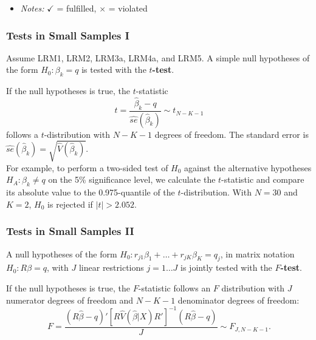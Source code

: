 \documentclass[a4paper,12pt]{article}
\begin{document}
\begin{table}[H]
{\begin{itemize}

\item \textit{Notes:} $\checkmark$ = fulfilled, $\times$ = violated%

\end{itemize}
}

\end{table}



\subsubsection*{Tests in Small Samples I}


Assume LRM1,  LRM2,  LRM3a,  LRM4a,  and LRM5.
A simple null hypotheses of the form $H_0: \beta_k = q$ is tested with the
\textbf{$t$-test}.

If the null hypotheses is true, the $t$-statistic
 $$t=\frac{\hat{\beta}_k-q}{\widehat{se}(\hat{\beta}_k)}\sim t_{N-K-1}$$
follows a $t$-distribution with $N-K-1$ degrees of freedom. The standard error is $\widehat{se}(\hat{\beta}_k) = \sqrt{\hat{V}(\hat{\beta}_k)}$.\\[2ex]

For example, to perform a two-sided test of $H_0$ against the alternative hypotheses $H_A: \beta_k \neq q$ on the 5\% significance level, we calculate the $t$-statistic and compare its absolute value to the 0.975-quantile of the $t$-distribution. With $N = 30$ and $K = 2$, $H_0$ is rejected if $|t| > 2.052$.



\subsubsection*{Tests in Small Samples II}


A null hypotheses of the form $H_0: r_{j1}\beta_1 + \ldots + r_{jK}\beta_K = q_j$, in matrix notation $H_0: R\beta = q$, with $J$ linear restrictions $j = 1\ldots J$ is jointly tested with the \textbf{$F$-test}.


If the null hypotheses is true, the $F$-statistic follows an $F$ distribution with $J$ numerator degrees of freedom and $N - K - 1$ denominator degrees of freedom:
$$F = \frac{\left(R\hat{\beta}-q\right)'\left[R\hat{V}(\hat{\beta}|X)R'\right]^{-1}\left(R\hat{\beta}-q\right)}{J}\sim F_{J,N-K-1}.$$
\end{document}
